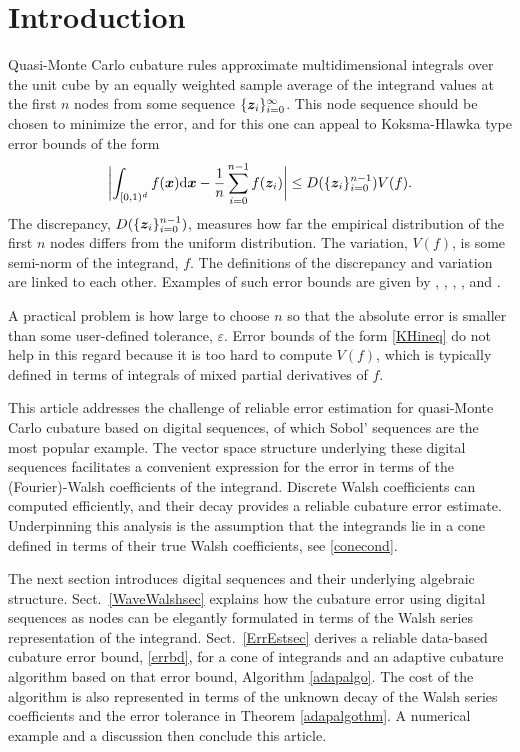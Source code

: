 \documentclass[graybox,footinfo]{svmult}
\newcommand{\bsx}{\boldsymbol{x}}    %
\newcommand{\bsz}{\boldsymbol{z}}    %
\begin{document}
\section{Introduction}

Quasi-Monte Carlo cubature rules approximate multidimensional integrals over the unit cube by an equally weighted sample average of the integrand values at the first $n$ nodes from some sequence $\nodes$.  This node sequence should be chosen to minimize the error, and for this one can appeal to Koksma-Hlawka type error bounds of the form 
\begin{equation} \label{KHineq}
\biggabs{\int_{\cube} f(\bsx) \D \bsx - \frac{1}{n} \sum_{i=0}^{n-1} f(\bsz_i)} \le D(\nodesn) V(f).
\end{equation}
The discrepancy, $D(\nodesn)$, measures how far the empirical distribution of the first $n$ nodes differs from the uniform distribution.  The variation, $V(f)$, is some semi-norm of the integrand, $f$.  The definitions of the discrepancy and variation are linked to each other. Examples of such error bounds are given by \cite[Chap.\ 2--3]{DicPil10a}, \cite{Hic97a}, \cite[Sec.\ 5.6]{Lem09a}, \cite[Chap.\ 2--3]{Nie92}, and \cite[Chap.\ 9]{NovWoz10a}.

A practical problem is how large to choose $n$ so that the absolute error is smaller than some user-defined tolerance, $\varepsilon$.  Error bounds of the form \eqref{KHineq} do not help in this regard because it is too hard to compute $V(f)$, which is typically defined in terms of integrals of mixed partial derivatives of $f$.

This article addresses the challenge of reliable error estimation for quasi-Monte Carlo cubature based on digital sequences, of which Sobol' sequences are the most popular example.  The vector space structure underlying these digital sequences facilitates a convenient expression for the error in terms of the (Fourier)-Walsh coefficients of the integrand.  Discrete Walsh coefficients can computed efficiently, and their decay provides a reliable cubature error estimate.  Underpinning this analysis is the assumption that the integrands lie in a cone  defined in terms of their true Walsh coefficients, see \eqref{conecond}.

The next section introduces digital sequences and their underlying algebraic structure.  Sect.\ \ref{WaveWalshsec} explains how the cubature error using digital sequences as nodes can be elegantly formulated in terms of the Walsh series representation of the integrand. Sect.\ \ref{ErrEstsec} derives a reliable data-based cubature error bound, \eqref{errbd}, for a cone of integrands and an adaptive cubature algorithm based on that error bound, Algorithm \ref{adapalgo}.  The cost of the algorithm is also represented in terms of the unknown decay of the Walsh series coefficients and the error tolerance in Theorem \ref{adapalgothm}.  A numerical example and a discussion then conclude this article.
\end{document}
